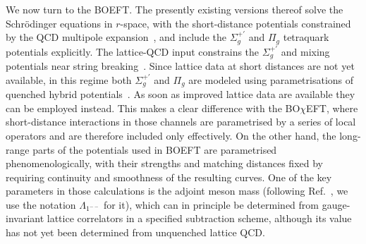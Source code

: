 \documentclass[aps,prd,showpacs,amsmath,twocolumn,superscriptaddress,floatfix,nofootinbib,notitlepage]{revtex4-2}
\newcommand{\BOchiEFT}{BO$\chi$EFT\xspace}
\begin{document}
We now turn to the BOEFT. 
The presently existing versions thereof 
solve the Schr\"odinger equations in $r$-space, with the short-distance potentials constrained by the QCD multipole expansion~\cite{Berwein:2024ztx}, and include the $\Sigma_g^{+\prime}$ and $\Pi_g$ tetraquark potentials explicitly. 
The lattice-QCD input constrains the $\Sigma_g^{+\prime}$ and mixing potentials near string breaking~\cite{Bulava:2024jpj}.
Since lattice data at short distances are not yet available,
in this regime both $\Sigma_g^{+\prime}$ and $\Pi_g$ are modeled using parametrisations of quenched hybrid potentials~\cite{Alasiri:2024nue,Brambilla:2026zfw}.
As soon as improved lattice data are available they can be
employed instead.
This makes a clear difference with the \BOchiEFT, where short-distance interactions in those channels are parametrised by a series of local operators and 
are therefore included only effectively.
On the other hand, the long-range parts of the potentials 
used in BOEFT
are parametrised phenomenologically, with their strengths and matching distances fixed by requiring continuity and smoothness of the resulting curves. One of the key parameters in those calculations is the adjoint meson mass (following Ref.~\cite{Brambilla:2024imu}, we use the notation $\Lambda_{1^{--}}$ for it), which can in principle be determined from gauge-invariant lattice correlators in a specified subtraction scheme, although its value has not yet been determined from unquenched lattice QCD. 
\end{document}
